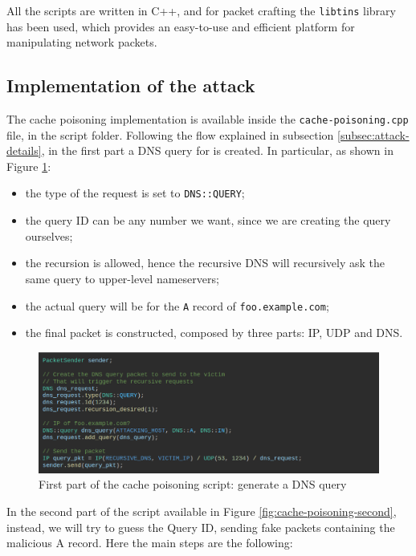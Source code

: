 \documentclass[11pt,a4paper]{article}
\begin{document}
\noindent
All the scripts are written in C++, and for packet crafting the \texttt{libtins} library has been used, which provides an easy-to-use and efficient platform for manipulating network packets.

\subsection{Implementation of the attack}
The cache poisoning implementation is available inside the \texttt{cache-poisoning.cpp} file, in the script folder. Following the flow explained in subsection \ref{subsec:attack-details}, in the first part a DNS query for is created. In particular, as shown in Figure \ref{fig:cache-poisoning-first}:
\begin{itemize}
    \item the type of the request is set to \texttt{DNS::QUERY};
    \item the query ID can be any number we want, since we are creating the query ourselves;
    \item the recursion is allowed, hence the recursive DNS will recursively ask the same query to upper-level nameservers;
    \item the actual query will be for the \texttt{A} record of \texttt{foo.example.com};
    \item the final packet is constructed, composed by three parts: IP, UDP and DNS.
\end{itemize}

\begin{figure}
    \centering
    \includegraphics[width=\textwidth]{cache-poisoning-first.png}
    \caption{First part of the cache poisoning script: generate a DNS query}
    \label{fig:cache-poisoning-first}
\end{figure}

\noindent
In the second part of the script available in Figure \ref{fig:cache-poisoning-second}, instead, we will try to guess the Query ID, sending fake packets containing the malicious A record. Here the main steps are the following:
\end{document}

